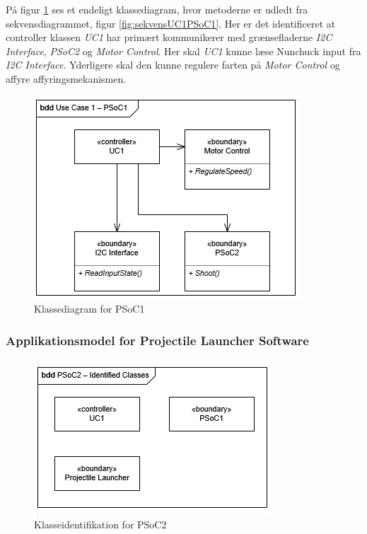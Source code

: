 På figur \ref{fig:klasseUC1PSoC1} ses et endeligt klassediagram, hvor metoderne er udledt fra sekvensdiagrammet, figur \ref{fig:sekvensUC1PSoC1}. Her er det identificeret at controller klassen \textit{UC1} har primært kommunikerer med grænsefladerne \textit{I2C Interface}, \textit{PSoC2} og \textit{Motor Control}. Her skal \textit{UC1} kunne læse Nunchuck input fra \textit{I2C Interface}. Yderligere skal den kunne regulere farten på \textit{Motor Control} og affyre affyringsmekanismen.

\begin{figure}[H]
	\centering
	\includegraphics[scale=0.8]{Systemarkitektur/images/klasseUC1PSoC1}
	\caption{Klassediagram for PSoC1}
	\label{fig:klasseUC1PSoC1}
\end{figure}

\subsubsection{Applikationsmodel for Projectile Launcher Software}

\begin{figure}[H]
	\centering
	\includegraphics[scale=0.8]{Systemarkitektur/images/klasseIdentificationUC1PSoC2}
	\caption{Klasseidentifikation for PSoC2}
	\label{fig:klasseidentifikationUC1PSoC2}
\end{figure}

